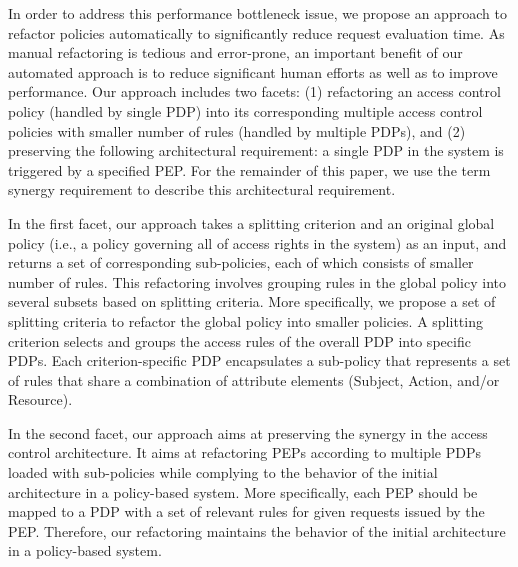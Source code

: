 In order to address this performance bottleneck issue, we propose an approach to refactor policies automatically to significantly reduce
request evaluation time.
As manual refactoring is tedious and error-prone, an important benefit of our automated approach is to reduce significant human efforts as well as to improve performance.
Our approach includes two facets: (1) refactoring an access control policy (handled by single PDP) into its corresponding multiple access control policies with smaller number of rules (handled by multiple PDPs),
and (2) preserving the following architectural requirement: a single PDP in the system is triggered by a specified PEP. For the remainder of this paper, we use the term synergy requirement to describe 
this architectural requirement.


In the first facet, our approach takes a splitting criterion and an original global policy (i.e., a policy governing all of access rights in the system) as an input, and returns a set of 
corresponding sub-policies, each of which consists of smaller number of rules.
This refactoring involves grouping rules in the global policy into several subsets based on splitting criteria.
More specifically, we propose a set of splitting criteria to refactor the global policy into smaller policies.
A splitting criterion selects and groups the access rules of the overall PDP into specific PDPs.
Each criterion-specific PDP encapsulates a sub-policy that represents a set of rules that share a combination
of attribute elements (Subject, Action, and/or Resource).

In the second facet, our approach aims at preserving the synergy in the access control architecture.
It aims at refactoring PEPs according to multiple PDPs loaded with sub-policies while complying to the behavior of the initial architecture in a policy-based system. More specifically, 
each PEP should be mapped to a PDP with a set of relevant rules for given requests issued by the PEP.
Therefore, our refactoring maintains the behavior of the initial architecture in a policy-based system.
 





